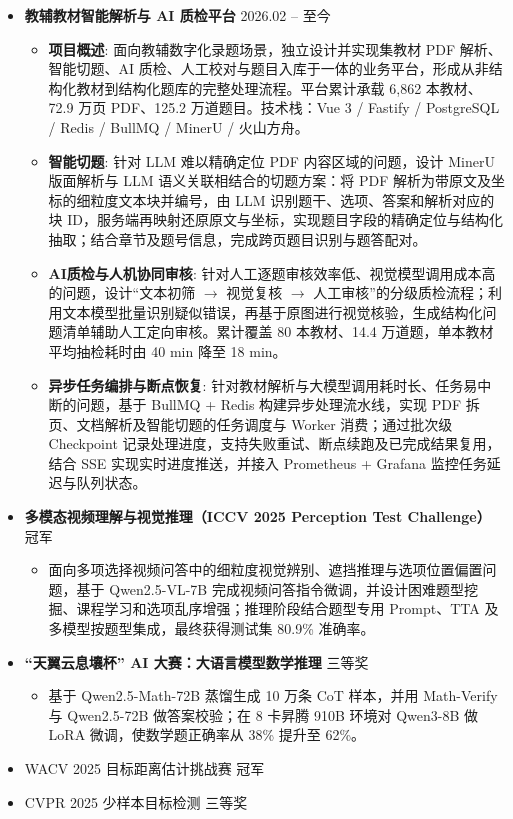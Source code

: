 \documentclass[zh]{resume}
\begin{document}
\begin{itemize}
  \item \textbf{教辅教材智能解析与 AI 质检平台} \hfill 2026.02 -- 至今
  \begin{itemize}
    \item \textbf{项目概述}: 面向教辅数字化录题场景，独立设计并实现集教材 PDF 解析、智能切题、AI 质检、人工校对与题目入库于一体的业务平台，形成从非结构化教材到结构化题库的完整处理流程。平台累计承载 6,862 本教材、72.9 万页 PDF、125.2 万道题目。技术栈：Vue 3 / Fastify / PostgreSQL / Redis / BullMQ / MinerU / 火山方舟。
    \item \textbf{智能切题}: 针对 LLM 难以精确定位 PDF 内容区域的问题，设计 MinerU 版面解析与 LLM 语义关联相结合的切题方案：将 PDF 解析为带原文及坐标的细粒度文本块并编号，由 LLM 识别题干、选项、答案和解析对应的块 ID，服务端再映射还原原文与坐标，实现题目字段的精确定位与结构化抽取；结合章节及题号信息，完成跨页题目识别与题答配对。
    \item \textbf{AI质检与人机协同审核}: 针对人工逐题审核效率低、视觉模型调用成本高的问题，设计``文本初筛 $\rightarrow$ 视觉复核 $\rightarrow$ 人工审核''的分级质检流程；利用文本模型批量识别疑似错误，再基于原图进行视觉核验，生成结构化问题清单辅助人工定向审核。累计覆盖 80 本教材、14.4 万道题，单本教材平均抽检耗时由 40 min 降至 18 min。
    \item \textbf{异步任务编排与断点恢复}: 针对教材解析与大模型调用耗时长、任务易中断的问题，基于 BullMQ + Redis 构建异步处理流水线，实现 PDF 拆页、文档解析及智能切题的任务调度与 Worker 消费；通过批次级 Checkpoint 记录处理进度，支持失败重试、断点续跑及已完成结果复用，结合 SSE 实现实时进度推送，并接入 Prometheus + Grafana 监控任务延迟与队列状态。
  \end{itemize}
\end{itemize}

\begin{itemize}
  \item \textbf{多模态视频理解与视觉推理（ICCV 2025 Perception Test Challenge）} \hfill 冠军
  \begin{itemize}
    \item 面向多项选择视频问答中的细粒度视觉辨别、遮挡推理与选项位置偏置问题，基于 Qwen2.5-VL-7B 完成视频问答指令微调，并设计困难题型挖掘、课程学习和选项乱序增强；推理阶段结合题型专用 Prompt、TTA 及多模型按题型集成，最终获得测试集 80.9\% 准确率。
  \end{itemize}

  \item \textbf{``天翼云息壤杯'' AI 大赛：大语言模型数学推理} \hfill 三等奖
  \begin{itemize}
    \item 基于 Qwen2.5-Math-72B 蒸馏生成 10 万条 CoT 样本，并用 Math-Verify 与 Qwen2.5-72B 做答案校验；在 8 卡昇腾 910B 环境对 Qwen3-8B 做 LoRA 微调，使数学题正确率从 38\% 提升至 62\%。
  \end{itemize}
  \item WACV 2025 目标距离估计挑战赛 \hfill 冠军
  \item CVPR 2025 少样本目标检测 \hfill 三等奖
\end{itemize}
\end{document}
